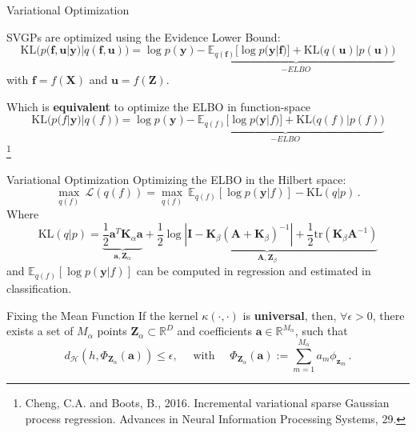 \documentclass[aspectratio=149]{beamer}
\begin{document}
    \begin{frame}{Variational Optimization}

        SVGPs are optimized using the Evidence Lower Bound:
        \[
        \text{KL}\big(p(\mathbf{f}, \mathbf{u}| \mathbf{y})|q(\mathbf{f}, \mathbf{u})\big) = \log p(\mathbf{y})\underbrace{-\  \mathbb{E}_{q(\mathbf{f})}[ \log p(\mathbf{y} | \mathbf{f})] + \text{KL}\big(q(\mathbf{u})|p(\mathbf{u})\big)}_{-ELBO}
        \]
        with \(\mathbf{f} =f(\mathbf{X})\) and \(\mathbf{u} = f(\mathbf{Z})\).
        
        \pause
        Which is \textbf{equivalent} to optimize the ELBO in function-space
        \[
        \text{KL}\big(p(f| \mathbf{y})|q(f)\big) = \log p(\mathbf{y})\underbrace{ - \ \mathbb{E}_{q(f)}[ \log p(\mathbf{y} | f)] + \text{KL}\big(q(f)|p(f)\big)}_{-ELBO}
        \]   
        {\let\thefootnote\relax\footnote{{Cheng, C.A. and Boots, B., 2016. Incremental variational sparse Gaussian process regression. Advances in Neural Information Processing Systems, 29.}}}
    \end{frame}

    \begin{frame}{Variational Optimization}
        Optimizing the ELBO in the Hilbert space:
        \[
        \max_{q(f)}\  \mathcal{L} (q(f)) = \max_{q(f)}\ \mathbb{E}_{q(f)} \left[ \log p(\mathbf{y}|f)\right] - \text{KL}\left(q|p\right)\,.
        \]
        Where
        \[
            \text{KL}\left(q | p\right) = \underbrace{\frac{1}{2} \bm{a}^T \bm{K}_{\alpha} \bm{a}}_{\bm{a}, \mathbf{Z}_\alpha} +  \underbrace{\frac{1}{2} \log |\bm{I} - \bm{K}_{\beta} (\bm{A} + \bm{K}_{\beta})^{-1}| + \frac{1}{2} \text{tr}\left( \bm{K}_\beta\bm{A}^{-1} \right)}_{\bm{A}, \mathbf{Z}_\beta}
        \]
        and \(\mathbb{E}_{q(f)}\left[ \log p(\mathbf{y}|f)\right] \) can be computed in regression and estimated in classification.
    \end{frame}

    \begin{frame}{Fixing the Mean Function}
        If the kernel \(\kappa(\cdot, \cdot)\) is {\color{orange}\textbf{universal}}, then, \(\forall \epsilon > 0\), there exists a set of \(M_\alpha\) points \(\mathbf{Z}_\alpha \subset \mathbb{R}^D\) and coefficients \(\bm{a}\in \mathbb{R}^{M_\alpha}\), such that
        \[
            d_{\mathcal{H}}(h, \Phi_{\mathbf{Z}_\alpha}(\bm{a})) \leq \epsilon, \quad\text{ with }\quad \Phi_{\mathbf{Z}_\alpha}(\bm{a}) := \sum_{m=1}^{M_\alpha} a_m \phi_{\mathbf{z}_m}\,.
        \]
    \end{frame}
\end{document}
